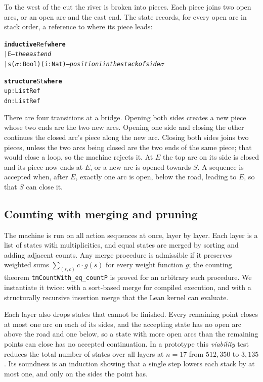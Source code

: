 \documentclass[11pt]{amsart}
\newcommand{\kw}[1]{\textbf{#1}}
\newenvironment{leancode}{\par\smallskip\noindent\begin{minipage}{\linewidth}\begin{alltt}\small}{\end{alltt}\end{minipage}\par\smallskip}
\theoremstyle{definition}
\theoremstyle{remark}
\newcommand{\code}[1]{\texttt{#1}}
\begin{document}
To the west of the cut the river is broken into pieces. Each piece joins two open arcs, or an
open arc and the east end. The state records, for every open arc in stack order, a reference to
where its piece leads:
\begin{leancode}
\kw{inductive} Ref \kw{where}
  | E                         \textit{-- the east end}
  | s (\(\sigma\) : Bool) (i : Nat)    \textit{-- position i in the stack of side \(\sigma\)}

\kw{structure} St \kw{where}
  up : List Ref
  dn : List Ref
\end{leancode}
There are four transitions at a bridge. Opening both sides creates a new piece whose two ends
are the two new arcs. Opening one side and closing the other continues the closed arc's piece
along the new arc. Closing both sides joins two pieces, unless the two arcs being closed are
the two ends of the same piece; that would close a loop, so the machine rejects it. At $E$ the
top arc on its side is closed and its piece now ends at $E$, or a new arc is opened towards
$S$. A sequence is accepted when, after $E$, exactly one arc is open, below the road, leading
to $E$, so that $S$ can close it.

\subsection{Counting with merging and pruning}
The machine is run on all action sequences at once, layer by layer. Each layer is a list of
states with multiplicities, and equal states are merged by sorting and adding adjacent
counts. Any merge procedure is admissible if it preserves weighted sums
$\sum_{(s,c)} c\cdot g(s)$ for every weight function $g$; the counting theorem
\code{tmCountWith\_eq\_countP} is proved for an arbitrary such procedure. We instantiate it
twice: with a sort-based merge for compiled execution, and with a structurally recursive
insertion merge that the Lean kernel can evaluate.

Each layer also drops states that cannot be finished. Every remaining point closes at most one
arc on each of its sides, and the accepting state has no open arc above the road and one below,
so a state with more open arcs than the remaining points can close has no accepted
continuation. In a prototype this \emph{viability} test reduces the total number of states over
all layers at $n=17$ from $512{,}350$ to $3{,}135$. Its soundness is an induction showing that
a single step lowers each stack by at most one, and only on the sides the point has.
\end{document}
